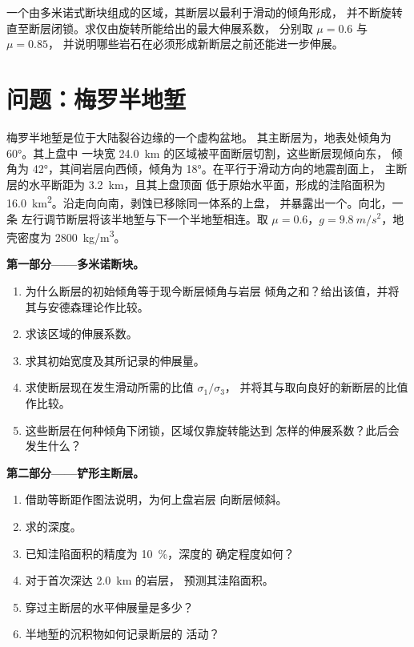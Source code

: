\begin{exercise}[$\star\star\star$]\label{exo:b3:extension-strike-slip:12}
一个由多米诺式断块组成的区域，其断层以最利于滑动的倾角形成，
并不断旋转直至断层闭锁。求仅由旋转所能给出的最大伸展系数，
分别取 $\mu = 0.6$ 与 $\mu = 0.85$，
并说明哪些岩石在必须形成新断层之前还能进一步伸展。
\end{exercise}

\section{问题：梅罗半地堑}

\begin{problem}
\label{pb:b3:extension-strike-slip:1}
梅罗半地堑是位于大陆裂谷边缘的一个虚构盆地。
其主断层为，地表处倾角为 \ang{60}。其上盘中
一块宽 \qty{24.0}{km} 的区域被平面断层切割，这些断层现倾向东，
倾角为 \ang{42}，其间岩层向西倾，倾角为 \ang{18}。在平行于滑动方向的地震剖面上，
主断层的水平断距为 \qty{3.2}{km}，且其上盘顶面
低于原始水平面，形成的洼陷面积为
\qty{16.0}{km^2}。沿走向向南，剥蚀已移除同一体系的上盘，
并暴露出一个。向北，一条
左行调节断层将该半地堑与下一个半地堑相连。取 $\mu =
0.6$，$g = \qty{9.8}{m/s^2}$，地壳密度为
\qty{2800}{kg/m^3}。

\medskip\noindent\textbf{第一部分——多米诺断块。}
\begin{enumerate}
  \item 为什么断层的初始倾角等于现今断层倾角与岩层
        倾角之和？给出该值，并将其与安德森理论作比较。
  \item 求该区域的伸展系数。
  \item 求其初始宽度及其所记录的伸展量。
  \item 求使断层现在发生滑动所需的比值 $\sigma_1/\sigma_3$，
        并将其与取向良好的新断层的比值作比较。
  \item 这些断层在何种倾角下闭锁，区域仅靠旋转能达到
        怎样的伸展系数？此后会发生什么？
\end{enumerate}

\medskip\noindent\textbf{第二部分——铲形主断层。}
\begin{enumerate}[resume]
  \item 借助等断距作图法说明，为何上盘岩层
        向断层倾斜。
  \item 求的深度。
  \item 已知洼陷面积的精度为 \qty{10}{\percent}，深度的
        确定程度如何？
  \item 对于首次深达 \qty{2.0}{km} 的岩层，
        预测其洼陷面积。
  \item 穿过主断层的水平伸展量是多少？
  \item 半地堑的沉积物如何记录断层的
        活动？
\end{enumerate}


\end{problem}
